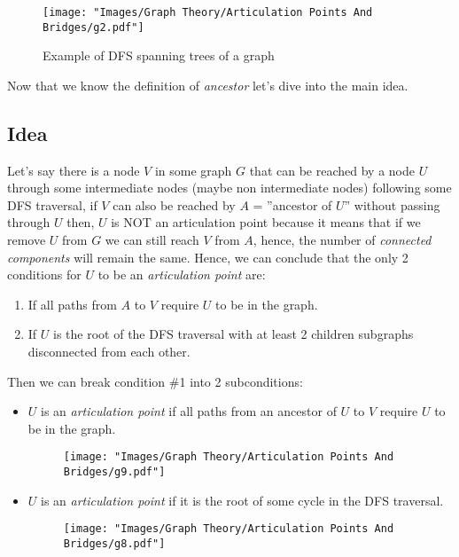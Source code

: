 \begin{figure}[H]
  \centering
  \texttt{[image: "Images/Graph Theory/Articulation Points And Bridges/g2.pdf"]}
  \caption{Example of DFS spanning trees of a graph}
  \label{fig:apb_g2}
\end{figure}


Now that we know the definition of \textit{ancestor} let's dive into the main idea.

\subsection*{Idea}

Let's say there is a node $V$ in some graph $G$ that can be reached by a node $U$ through some
intermediate nodes (maybe non intermediate nodes) following some DFS traversal, if $V$ can also be
reached by $A$ = ''ancestor of $U$'' without passing through $U$ then, $U$ is NOT an articulation point
because it means that if we remove $U$ from $G$ we can still reach $V$ from $A$, hence, the number of
\textit{connected components} will remain the same. Hence, we can conclude that the only 2 conditions for
$U$ to be an \textit{articulation point} are:

\begin{enumerate}
  \item If all paths from $A$ to $V$ require $U$ to be in the graph.
  \item If $U$ is the root of the DFS traversal with at least 2 children subgraphs disconnected from each other.
\end{enumerate}

\noindent
Then we can break condition \#1 into 2 subconditions:

\begin{itemize}
  \item[\bullet] $U$ is an \textit{articulation point} if all paths from an ancestor of $U$ to $V$
        require $U$ to be in the graph.
        \begin{figure}[H]
          \centering
          \texttt{[image: "Images/Graph Theory/Articulation Points And Bridges/g9.pdf"]}
          \caption{}
          \label{fig:apb_g3}
        \end{figure}
  \item[\bullet] $U$ is an \textit{articulation point} if it is the root of some cycle in the DFS traversal.
        \begin{figure}[H]
          \centering
          \texttt{[image: "Images/Graph Theory/Articulation Points And Bridges/g8.pdf"]}
          \caption{}
          \label{fig:apb_g3}
        \end{figure}
\end{itemize}